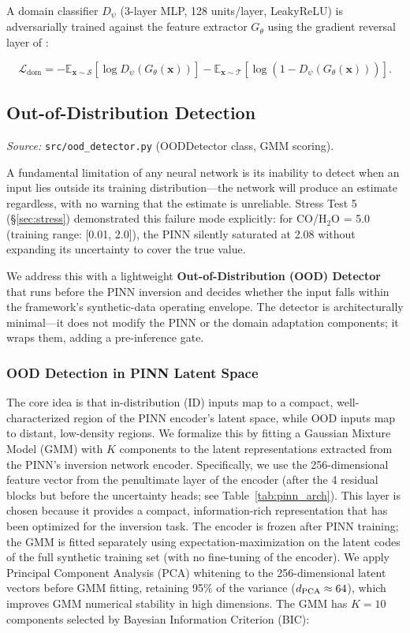 \documentclass[usenatbib]{mnras}
\begin{document}
A domain classifier $D_\psi$ (3-layer MLP, 128 units/layer, LeakyReLU) is adversarially trained against the feature extractor $G_\theta$ using the gradient reversal layer of \citet{ganin16}:

\begin{equation}\label{eq:adv_loss}
\mathcal{L}_{\text{dom}} = -\mathbb{E}_{\mathbf{x}\sim\mathcal{S}}[\log D_\psi(G_\theta(\mathbf{x}))] - \mathbb{E}_{\mathbf{x}\sim\mathcal{T}}[\log(1 - D_\psi(G_\theta(\mathbf{x})))].
\end{equation}

\subsection{Out-of-Distribution Detection}\label{sec:ood}

\textit{Source:} \texttt{src/ood\_detector.py} (OODDetector class, GMM scoring).

A fundamental limitation of any neural network is its inability to detect when an input lies outside its training distribution---the network will produce an estimate regardless, with no warning that the estimate is unreliable. Stress Test 5 (\S\ref{sec:stress}) demonstrated this failure mode explicitly: for CO/H$_2$O = 5.0 (training range: [0.01, 2.0]), the PINN silently saturated at 2.08 without expanding its uncertainty to cover the true value.

We address this with a lightweight \textbf{Out-of-Distribution (OOD) Detector} that runs before the PINN inversion and decides whether the input falls within the framework's synthetic-data operating envelope. The detector is architecturally minimal---it does not modify the PINN or the domain adaptation components; it wraps them, adding a pre-inference gate.

\subsubsection{OOD Detection in PINN Latent Space}

The core idea is that in-distribution (ID) inputs map to a compact, well-characterized region of the PINN encoder's latent space, while OOD inputs map to distant, low-density regions. We formalize this by fitting a Gaussian Mixture Model (GMM) with $K$ components to the latent representations extracted from the PINN's inversion network encoder. Specifically, we use the 256-dimensional feature vector from the penultimate layer of the encoder (after the 4 residual blocks but before the uncertainty heads; see Table~\ref{tab:pinn_arch}). This layer is chosen because it provides a compact, information-rich representation that has been optimized for the inversion task. The encoder is frozen after PINN training; the GMM is fitted separately using expectation-maximization on the latent codes of the full synthetic training set (with no fine-tuning of the encoder). We apply Principal Component Analysis (PCA) whitening to the 256-dimensional latent vectors before GMM fitting, retaining 95\% of the variance ($d_{\rm PCA} \approx 64$), which improves GMM numerical stability in high dimensions. The GMM has $K=10$ components selected by Bayesian Information Criterion (BIC):
\end{document}
